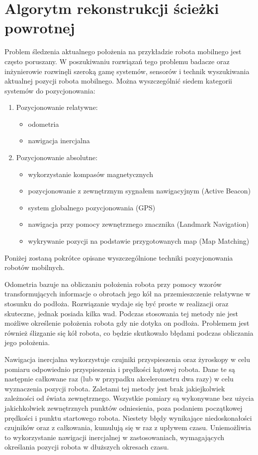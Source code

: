 \section{Algorytm rekonstrukcji ścieżki powrotnej}
\label{sec:rtrwca}
Problem śledzenia aktualnego położenia na przykładzie robota mobilnego jest
często poruszany. W poszukiwaniu rozwiązań tego problemu badacze oraz
inżynierowie rozwinęli szeroką gamę systemów, sensorów i technik wyszukiwania
aktualnej pozycji robota mobilnego. Można wyszczególnić siedem kategorii systemów
do pozycjonowania:
\begin{enumerate}
  \item Pozycjonowanie relatywne:
  \begin{itemize}
    \item odometria
    \item nawigacja inercjalna
  \end{itemize}
  \item Pozycjonowanie absolutne:
  \begin{itemize}
    \item wykorzystanie kompasów magnetycznych
    \item pozycjonowanie z zewnętrznym sygnałem nawigacyjnym (Active Beacon)
    \item system globalnego pozycjonowania (GPS)
    \item nawigacja przy pomocy zewnętrznego znacznika (Landmark Navigation)
    \item wykrywanie pozycji na podstawie przygotowanych map (Map Matching)
  \end{itemize}
\end{enumerate}
Poniżej zostaną pokrótce opisane wyszczególnione techniki pozycjonowania robotów mobilnych.

Odometria bazuje na obliczaniu położenia robota przy pomocy wzorów
transformujących informacje o obrotach jego kół na przemieszczenie relatywne w
stosunku do podłoża. Rozwiązanie wydaje się być proste w realizacji oraz
skuteczne, jednak posiada kilka wad. Podczas stosowania tej metody nie jest
możliwe określenie położenia robota gdy nie dotyka on podłoża. Problemem jest
również ślizganie się kół robota, co będzie skutkowało błędami podczas obliczania
jego położenia.

Nawigacja inercjalna wykorzystuje czujniki przyspieszenia oraz żyroskopy w celu
pomiaru odpowiednio przyspieszenia i prędkości kątowej robota. Dane te są
następnie całkowane raz (lub w przypadku akcelerometru dwa razy) w celu
wyznaczenia pozycji robota. Zaletami tej metody jest brak jakiejkolwiek
zależności od świata zewnętrznego. Wszystkie pomiary są wykonywane bez użycia
jakichkolwiek zewnętrznych punktów odniesienia, poza podaniem początkowej
prędkości i punktu startowego robota. Niestety błędy wynikające niedoskonałości
czujników oraz z całkowania, kumulują się w raz z upływem czasu. Uniemożliwia to
wykorzystanie nawigacji inercjalnej w zastosowaniach, wymagających określania
pozycji robota w dłuższych okresach czasu.

